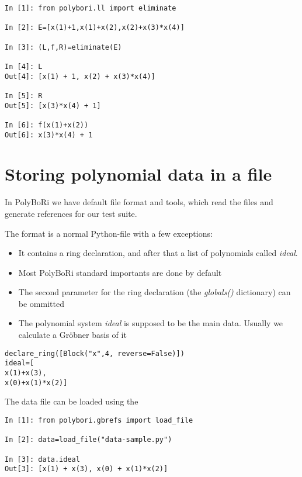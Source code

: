 \documentclass[]{article}
\newcommand{\PolyBoRi}{{\sc PolyBoRi}\xspace}
\newcommand{\Groebner}{Gröbner\xspace}
\newcommand{\functionname}[1]{\textit{#1}\xspace}
\begin{document}
\begin{verbatim}
In [1]: from polybori.ll import eliminate

In [2]: E=[x(1)+1,x(1)+x(2),x(2)+x(3)*x(4)]

In [3]: (L,f,R)=eliminate(E)

In [4]: L
Out[4]: [x(1) + 1, x(2) + x(3)*x(4)]

In [5]: R
Out[5]: [x(3)*x(4) + 1]

In [6]: f(x(1)+x(2))
Out[6]: x(3)*x(4) + 1
\end{verbatim}

\section{Storing polynomial data in a file}

In \PolyBoRi we have default file format and tools, which read the files and generate references for our test suite.

The format is a normal Python-file with a few exceptions:
\begin{itemize}
    \item It contains a ring declaration, and after that a list of polynomials called \functionname{ideal}.
    \item Most \PolyBoRi standard importants are done by default
    \item The second parameter for the ring declaration (the \functionname{globals()} dictionary) can be ommitted
    \item The polynomial system \functionname{ideal} is supposed to be the main data.
    Usually we calculate a \Groebner basis of it
\end{itemize}
\begin{verbatim}
declare_ring([Block("x",4, reverse=False)])
ideal=[
x(1)+x(3),
x(0)+x(1)*x(2)]  
\end{verbatim}

The data file can be loaded using the

\begin{verbatim}
In [1]: from polybori.gbrefs import load_file

In [2]: data=load_file("data-sample.py")

In [3]: data.ideal
Out[3]: [x(1) + x(3), x(0) + x(1)*x(2)]
\end{verbatim}


%

\end{document}
